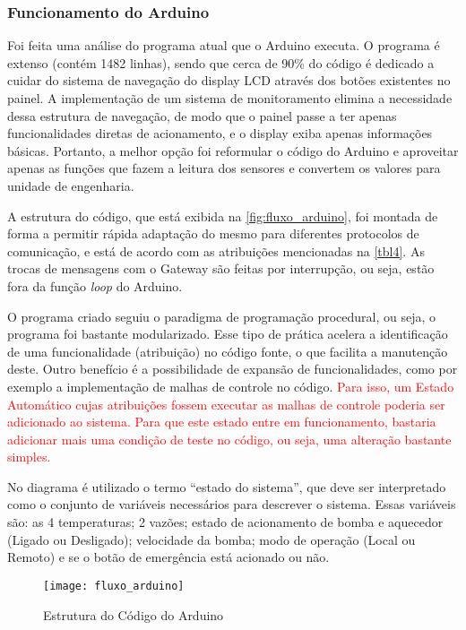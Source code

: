 			
			\subsubsection{Funcionamento do Arduino}
				\label{sec:met_arduino}
				Foi feita uma análise do programa atual que o Arduino executa. O programa é extenso (contém 1482 linhas), sendo que cerca de 90\% do código é dedicado a cuidar do sistema de navegação do display LCD através dos botões existentes no painel.  A implementação de um sistema de monitoramento elimina a necessidade dessa estrutura de navegação, de modo que o painel passe a ter apenas funcionalidades diretas de acionamento, e o display exiba apenas informações básicas. Portanto, a melhor opção foi reformular o código do Arduino e aproveitar apenas as funções que fazem a leitura dos sensores e convertem os valores para unidade de engenharia.
				
				A estrutura do código, que está exibida na \autoref{fig:fluxo_arduino}, foi montada de forma a permitir rápida adaptação do mesmo para diferentes protocolos de comunicação, e está de acordo com as atribuições mencionadas na \autoref{tbl4}. As trocas de mensagens com o Gateway são feitas por interrupção, ou seja, estão fora da função \textit{loop} do Arduino. 
				
				O programa criado seguiu o paradigma de programação procedural, ou seja, o programa foi bastante modularizado. Esse tipo de prática acelera a identificação de uma funcionalidade (atribuição) no código fonte, o que facilita a manutenção deste. Outro benefício é a possibilidade de expansão de funcionalidades, como por exemplo a implementação de malhas de controle no código. \textcolor{red}{ Para isso, um Estado Automático cujas atribuições fossem executar as malhas de controle poderia ser adicionado ao sistema. Para que este estado entre em funcionamento, bastaria adicionar mais uma condição de teste no código, ou seja, uma alteração bastante simples.}
				
				No diagrama é utilizado o termo ``estado do sistema'', que deve ser interpretado como o conjunto de variáveis necessários para descrever o sistema. Essas variáveis são: as 4 temperaturas; 2 vazões; estado de acionamento de bomba e aquecedor (Ligado ou Desligado); velocidade da bomba; modo de operação (Local ou Remoto) e se o botão de emergência está acionado ou não.
			
				\begin{figure}[!htb]	
					\captionsetup{justification=centering}
					\begin{center}
						\texttt{[image: fluxo\_arduino]}  %
						\caption[Estrutura do Código do Arduino]{\label{fig:fluxo_arduino} Estrutura do Código do Arduino }
					\end{center}		
				\end{figure}
			
